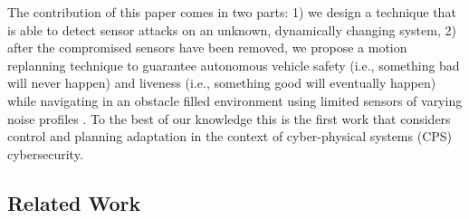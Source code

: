 The contribution of this paper comes in two parts: 1) we design a technique that is able to detect sensor attacks on an unknown, dynamically changing system, 2) after the compromised sensors have been removed, we propose a motion replanning technique  to guarantee autonomous vehicle safety (i.e., something bad will never happen) and liveness (i.e., something good will eventually happen) while navigating in an obstacle filled environment using limited sensors of varying noise profiles . 
To the best of our knowledge this is the first work that considers control and planning adaptation in the context of cyber-physical systems (CPS) cybersecurity.






\subsection{Related Work}
\label{sec:Related Work}

